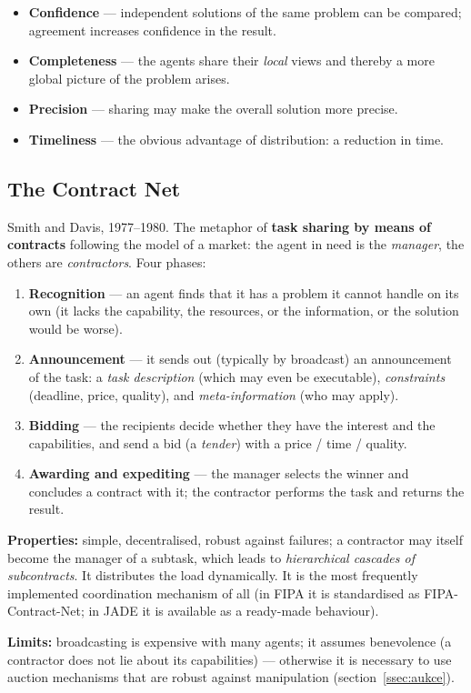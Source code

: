 \documentclass[11pt,a4paper]{article}
\theoremstyle{definition}
\begin{document}
\begin{defbox}
\begin{itemize}
\item \textbf{Confidence} --- independent solutions of the same problem can be compared;
  agreement increases confidence in the result.
\item \textbf{Completeness} --- the agents share their \emph{local} views and thereby a more global
  picture of the problem arises.
\item \textbf{Precision} --- sharing may make the overall solution more precise.
\item \textbf{Timeliness} --- the obvious advantage of distribution: a reduction in time.
\end{itemize}
\end{defbox}
\subsection{The Contract Net}

\begin{defbox}
Smith and Davis, 1977--1980. The metaphor of \textbf{task sharing by means of contracts} following the
model of a market: the agent in need is the \emph{manager}, the others are \emph{contractors}. Four
phases:
\begin{enumerate}
\item \textbf{Recognition} --- an agent finds that it has a problem it cannot handle on its own (it
  lacks the capability, the resources, or the information, or the solution would be worse).
\item \textbf{Announcement} --- it sends out (typically by broadcast) an announcement of the task:
  a \emph{task description} (which may even be executable), \emph{constraints} (deadline, price,
  quality), and \emph{meta-information} (who may apply).
\item \textbf{Bidding} --- the recipients decide whether they have the interest and the capabilities,
  and send a bid (a \emph{tender}) with a price / time / quality.
\item \textbf{Awarding and expediting} --- the manager selects the winner and concludes a contract with
  it; the contractor performs the task and returns the result.
\end{enumerate}
\textbf{Properties:} simple, decentralised, robust against failures; a contractor may itself become
the manager of a subtask, which leads to \emph{hierarchical cascades of subcontracts}.
It distributes the load dynamically. It is the most frequently implemented coordination mechanism of
all (in FIPA it is standardised as FIPA-Contract-Net; in JADE it is available as a ready-made
behaviour).

\textbf{Limits:} broadcasting is expensive with many agents; it assumes benevolence (a contractor does
not lie about its capabilities) --- otherwise it is necessary to use auction mechanisms that are robust
against manipulation (section~\ref{ssec:aukce}).
\end{defbox}
\end{document}
